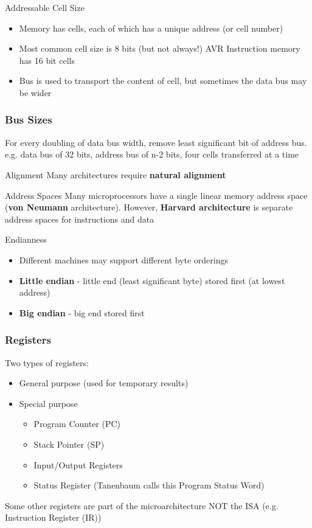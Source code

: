 \begin{note}{Addressable Cell Size}
	\begin{itemize}
		\item Memory has cells, each of which has a unique address (or cell number)
		\item Most common cell size is 8 bits (but not always!)
		\subitem AVR Instruction memory has 16 bit cells
		\item Bus is used to transport the content of cell, but sometimes the data bus may be wider
	\end{itemize}
\end{note}

\subsubsection{Bus Sizes}
For every doubling of data bus width, remove least significant bit of address bus. e.g. data bus of 32 bits, address bus of n-2 bits, four cells transferred at a time

\begin{note}{Alignment}
Many architectures require \textbf{natural alignment}	
\end{note}

\begin{note}{Address Spaces}
Many microprocessors have a single linear memory address space (\textbf{von Neumann} architecture). However, \textbf{Harvard architecture} is separate address spaces for instructions and data	
\end{note}

\begin{note}{Endianness}
	\begin{itemize}
		\item Different machines may support different byte orderings
		\item \textbf{Little endian} - little end (least significant byte) stored first (at lowest address)
		\item \textbf{Big endian} - big end stored first	
	\end{itemize}
\end{note}

\subsubsection{Registers}
Two types of registers:
\begin{itemize}
	\item General purpose (used for temporary results)
	\item Special purpose
	\begin{itemize}
		\item Program Counter (PC)
		\item Stack Pointer (SP)
		\item Input/Output Registers
		\item Status Register (Tanenbaum calls this Program Status Word)
	\end{itemize}
\end{itemize}
Some other registers are part of the microarchitecture NOT the ISA (e.g. Instruction Register (IR))

